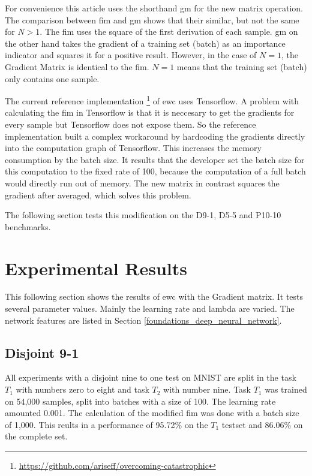 For convenience this article uses the shorthand \acrfull{gm} for the new matrix operation.
\newline
The comparison between \acrshort{fim} and \acrshort{gm} shows that their similar, but not the same for $N > 1$.
The \acrshort{fim} uses the square of the first derivation of each sample. \acrshort{gm} on the other hand takes the gradient of a training set (batch) as an importance indicator and squares it for a positive result.
However, in the case of $N=1$, the Gradient Matrix is identical to the \acrshort{fim}.
$N=1$ means that the training set (batch) only contains one sample.

The current reference implementation \footnote[1]{\url{https://github.com/ariseff/overcoming-catastrophic}} of \acrshort{ewc} uses Tensorflow.
A problem with calculating the \acrshort{fim} in Tensorflow is that it is neccesary to get the gradients for every sample but Tensorflow does not expose them.
So the reference implementation built a complex workaround by hardcoding the gradients directly into the computation graph of Tensorflow.
This increases the memory consumption by the batch size.
It results that the developer set the batch size for this computation to the fixed rate of 100, because the computation of a full batch would directly run out of memory.
\cite{github_ewc_issue_one}
The new matrix in contrast squares the gradient after averaged, which solves this problem.

The following section tests this modification on the D9-1, D5-5 and P10-10 benchmarks.

\newpage
\section{Experimental Results}

This following section shows the results of \acrshort{ewc} with the Gradient matrix.
It tests several parameter values.
Mainly the learning rate and lambda are varied.
The network features are listed in Section \ref{foundations_deep_neural_network}.

\subsection{Disjoint 9-1}

All experiments with a disjoint nine to one test on MNIST are split in the task $T_1$ with numbers zero to eight and task $T_2$ with number nine.
Task $T_1$ was trained on 54,000 samples, split into batches with a size of 100.
The learning rate amounted 0.001.
The calculation of the modified \acrshort{fim} was done with a batch size of 1,000.
This reults in a performance of 95.72\% on the $T_1$ testset and 86.06\% on the complete set.

